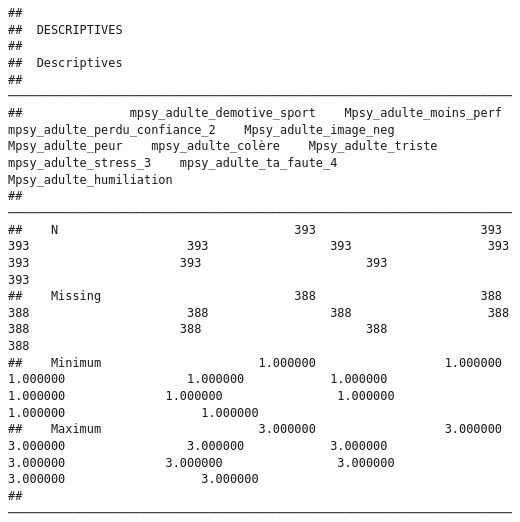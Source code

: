 \documentclass[
]{article}
\begin{document}
\begin{verbatim}
## 
##  DESCRIPTIVES
## 
##  Descriptives                                                                                                                                                                                                                                                               
##  ────────────────────────────────────────────────────────────────────────────────────────────────────────────────────────────────────────────────────────────────────────────────────────────────────────────────────────────────────────────────────────────────────────── 
##               mpsy_adulte_demotive_sport    Mpsy_adulte_moins_perf    mpsy_adulte_perdu_confiance_2    Mpsy_adulte_image_neg    Mpsy_adulte_peur    mpsy_adulte_colère    Mpsy_adulte_triste    mpsy_adulte_stress_3    mpsy_adulte_ta_faute_4    Mpsy_adulte_humiliation   
##  ────────────────────────────────────────────────────────────────────────────────────────────────────────────────────────────────────────────────────────────────────────────────────────────────────────────────────────────────────────────────────────────────────────── 
##    N                                 393                       393                              393                      393                 393                   393                   393                     393                       393                        393   
##    Missing                           388                       388                              388                      388                 388                   388                   388                     388                       388                        388   
##    Minimum                      1.000000                  1.000000                         1.000000                 1.000000            1.000000              1.000000              1.000000                1.000000                  1.000000                   1.000000   
##    Maximum                      3.000000                  3.000000                         3.000000                 3.000000            3.000000              3.000000              3.000000                3.000000                  3.000000                   3.000000   
##  ──────────────────────────────────────────────────────────────────────────────────────────────────────────────────────────────────────────────────────────────────────────────────────────────────────────────────────────────────────────────────────────────────────────
\end{verbatim}
\end{document}
